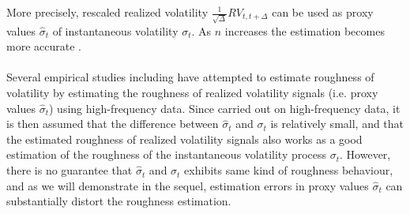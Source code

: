 \documentclass{article}
\begin{document}
More precisely, rescaled realized volatility $\frac{1}{\sqrt{\Delta}}RV_{t,t+\Delta}$ can be used as proxy values $\hat{\sigma}_t$ of instantaneous volatility $\sigma_t$. As $n$ increases the estimation becomes more accurate \cite{cont}.\\\\
Several empirical studies including \cite{gatheral} have attempted to estimate roughness of volatility by estimating the roughness of realized volatility signals (i.e. proxy values $\hat{\sigma}_t$) using high-frequency data. Since carried out on high-frequency data, it is then assumed that the difference between $\hat{\sigma}_t$ and $\sigma_t$ is relatively small, and that the estimated roughness of realized volatility signals also works as a good estimation of the roughness of the instantaneous volatility process $\sigma_t$. However, there is no guarantee that $\hat{\sigma}_t$ and $\sigma_t$ exhibits same kind of roughness behaviour, and as we will demonstrate in the sequel, estimation errors in proxy values $\hat{\sigma}_t$ can substantially distort the roughness estimation.
\end{document}
